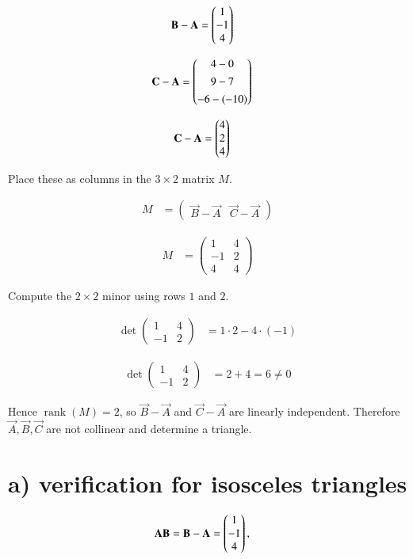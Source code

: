 \documentclass[journal]{IEEEtran}
\begin{document}
\begin{align}
\mathbf{B}-\mathbf{A} &= \begin{pmatrix}1\\-1\\4\end{pmatrix}
\end{align}

\begin{align}
\mathbf{C}-\mathbf{A} &= \begin{pmatrix}4-0\\[4pt]9-7\\[4pt]-6-(-10)\end{pmatrix}
\end{align}

\begin{align}
\mathbf{C}-\mathbf{A} &= \begin{pmatrix}4\\2\\4\end{pmatrix}
\end{align}

Place these as columns in the $3\times 2$ matrix $M$.

\begin{align}
M &= \begin{pmatrix} \vec{B}-\vec{A} & \vec{C}-\vec{A} \end{pmatrix}
\end{align}

\begin{align}
M &= \begin{pmatrix}
1 & 4\\[4pt]
-1 & 2\\[4pt]
4 & 4
\end{pmatrix}
\end{align}

Compute the $2\times2$ minor using rows $1$ and $2$.

\begin{align}
\det\begin{pmatrix}1 & 4\\[4pt] -1 & 2\end{pmatrix}
&= 1\cdot 2 - 4\cdot(-1)
\end{align}

\begin{align}
\det\begin{pmatrix}1 & 4\\[4pt] -1 & 2\end{pmatrix}
&= 2 + 4 = 6 \neq 0
\end{align}

Hence $\operatorname{rank}(M)=2$, so $\vec{B}-\vec{A}$ and $\vec{C}-\vec{A}$ are linearly independent.  
Therefore $\vec{A},\vec{B},\vec{C}$ are not collinear and determine a triangle.

\section*{a) verification for isosceles triangles}
\begin{align}
\mathbf{AB} &= \mathbf{B}-\mathbf{A} = \begin{pmatrix}1\\-1\\4\end{pmatrix},
\end{align}
\end{document}
